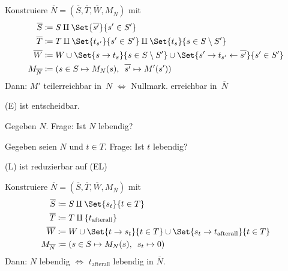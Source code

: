 \documentclass{cheat-sheet}
\newcommand{\reducesManyOneToLin}{\xmapsto{\mathrm{lin}}_M} %
\begin{document}
\begin{beweis}[$\text{(TE)}  \reducesManyOneToLin \text{(0-E)}$]
  Konstruiere $\overline{N} = (\overline{S}, \overline{T}, \overline{W}, M_{\overline{N}})$ mit
  \begin{align*}
    \overline{S} & \coloneqq S \amalg \Set{\overline{s'}}{s' \in S'} \\
    \overline{T} & \coloneqq T \amalg \Set{t_{s'}}{s' \in S'} \amalg \Set{t_s}{s \in S \setminus S'} \\
    \overline{W} & \coloneqq W \cup \Set{s \to t_s}{s \in S \setminus S'} \cup \Set{s' \to t_{s'} \leftarrow \overline{s'}}{s' \in S'} \\
    M_{\overline{N}} & \coloneqq (s \in S \mapsto M_N(s), \enspace \overline{s'} \mapsto M'(s'))
  \end{align*}
  Dann: $M'$ teilerreichbar in~$N$ $\iff$ Nullmark. erreichbar in~$\overline{N}$
\end{beweis}

\begin{satz}
  (E) ist entscheidbar.
\end{satz}


\begin{problem}
  Gegeben $N$. Frage: Ist $N$ lebendig?
\end{problem}

\begin{problem}
  Gegeben seien $N$ und $t \in T$.
  Frage: Ist $t$ lebendig?
\end{problem}

\begin{satz}
  (L) ist reduzierbar auf (EL)
\end{satz}

\begin{beweis}
  Konstruiere $\overline{N} = (\overline{S}, \overline{T}, \overline{W}, M_{\overline{N}})$ mit
  \begin{align*}
    \overline{S} & \coloneqq S \amalg \Set{s_t}{t \in T} \\
    \overline{T} & \coloneqq T \amalg \{ t_\mathrm{afterall} \} \\
    \overline{W} & \coloneqq W \cup \Set{t \to s_t}{t \in T} \cup \Set{s_t \to t_\mathrm{afterall}}{t \in T} \\
    M_{\overline{N}} & \coloneqq (s \in S \mapsto M_N(s), \enspace s_t \mapsto 0)
  \end{align*}
  Dann: $N$ lebendig $\iff$ $t_\mathrm{afterall}$ lebendig in $\overline{N}$.
\end{beweis}
\end{document}
